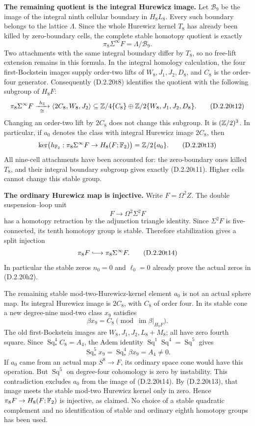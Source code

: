 \medskip\noindent
\textbf{The remaining quotient is the integral Hurewicz image.}
Let $\mathcal B_9$ be the image of the integral ninth
cellular boundary in $H_8L_8$. Every such boundary belongs
to the lattice $\Lambda$. Since the whole Hurewicz kernel
$T_8$ has already been killed by zero-boundary cells,
the complete stable homotopy quotient is exactly
\[
 \pi_8\Sigma^\infty F=\Lambda/\mathcal B_9.
 \tag{D.2.20t11}
\]
Two attachments with the same integral boundary differ
by $T_8$, so no free-lift extension remains in this formula.
In the integral homology calculation, the four
first-Bockstein images supply order-two lifts of
$W_8,J_1,J_2,D_8$, and $C_8$ is the order-four generator.
Consequently \textup{(D.2.20t8)} identifies the quotient
with the following subgroup of $H_8F$:
\[
 \pi_8\Sigma^\infty F
 \xrightarrow[\cong]{\ h_{\mathbb Z}\ }
 \langle2C_8,W_8,J_2\rangle
       \subseteq\mathbb Z/4\{C_8\}\oplus
           \mathbb Z/2\{W_8,J_1,J_2,D_8\}.
 \tag{D.2.20t12}
\]
Changing an order-two lift by $2C_8$ does not change
this subgroup. It is $(\mathbb Z/2)^3$. In particular, if
$a_0$ denotes the class with integral Hurewicz image
$2C_8$, then
\[
 \ker\bigl(h_{\mathbb F_2}:\pi_8\Sigma^\infty F
                     \to H_8(F;\mathbb F_2)\bigr)
       =\mathbb Z/2\{a_0\}.
 \tag{D.2.20t13}
\]
All nine-cell attachments have been accounted for:
the zero-boundary ones killed $T_8$, and their integral
boundary subgroup gives exactly \textup{(D.2.20t11)}.
Higher cells cannot change this stable group.

\medskip\noindent
\textbf{The ordinary Hurewicz map is injective.}
Write $F=\Omega^2 Z$. The double suspension--loop unit
\[
 F\longrightarrow\Omega^2\Sigma^2F
\]
has a homotopy retraction by the adjunction triangle
identity. Since $\Sigma^2F$ is five-connected, its
tenth homotopy group is stable. Therefore stabilization
gives a split injection
\[
 \pi_8F\lhook\joinrel\longrightarrow\pi_8\Sigma^\infty F.
 \tag{D.2.20t14}
\]
In particular the stable zeros $n_0=0$ and $\ell_0=0$
already prove the actual zeros in \textup{(D.2.20h2)}.

The remaining stable mod-two-Hurewicz-kernel element
$a_0$ is not an actual sphere map. Its integral
Hurewicz image is $2C_8$, with $C_8$ of order four.
In its stable cone a new degree-nine mod-two class $x_9$
satisfies
\[
 \beta x_9=C_8\pmod{\operatorname{im}\beta|_{H_9F}}.
\]
The old first-Bockstein images are
$W_8,J_1,J_2,L_8+M_8$; all have zero fourth square.
Since $\operatorname{Sq}_*^4C_8=A_4$, the Adem identity
$\operatorname{Sq}^1\operatorname{Sq}^4
=\operatorname{Sq}^5$ gives
\[
 \operatorname{Sq}_*^5x_9
   =\operatorname{Sq}_*^4\beta x_9=A_4\ne0.
 \tag{D.2.20t15}
\]
If $a_0$ came from an actual map $S^8\to F$, its
ordinary space cone would have this operation.
But $\operatorname{Sq}^5$ on degree-four cohomology
is zero by instability. This contradiction excludes
$a_0$ from the image of \textup{(D.2.20t14)}.
By \textup{(D.2.20t13)}, that image meets the stable
mod-two Hurewicz kernel only in zero. Hence
$\pi_8F\to H_8(F;\mathbb F_2)$ is injective, as claimed.
No choice of a stable quadratic complement and no
identification of stable and ordinary eighth homotopy
groups has been used.
